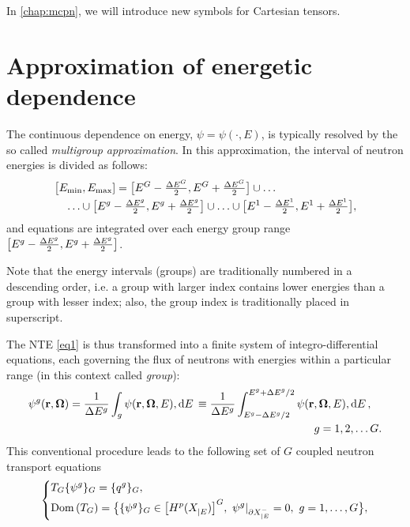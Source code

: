 In \cref{chap:mcpn}, we will introduce new symbols for Cartesian tensors.


\section{Approximation of energetic dependence}\label{sec:MG}

The continuous dependence on energy, $\psi = \psi(\cdot, E)$, is typically resolved by the so called \textit{multigroup
approximation}. In this approximation, the interval of neutron energies is divided as follows:
$$
\begin{multlined}
  \bigl[\Emin,\Emax] = \bigl[E^{G}-\dEh{G},E^{G}+\dEh{G}\bigr]\cup \ldots\\
  \ldots \cup \bigl[E^{g}-\dEh{g}, E^{g}+\dEh{g}\bigr] \cup \ldots \cup
  \bigl[E^1-\dEh{1},E^{1}+\dEh{1}\bigr],
\end{multlined} 
$$
and equations  are integrated over each energy group range 
\linebreak
\mbox{$\bigl[E^{g}-\tfrac{\Delta E^{g}}{2}, E^{g}+\tfrac{\Delta E^{g}}{2}\bigr]$}.
\begin{remark}
Note that the energy intervals (groups) are traditionally numbered in a descending order, i.e. a group with larger index
contains lower energies than a group with lesser index; also, the group index is traditionally placed in superscript. 
\end{remark}
The NTE \eqref{eq1} is thus transformed into a finite system of integro-differential equations, each
governing the flux of neutrons with energies within a particular range (in this context called \textit{group}):
\begin{equation}\label{eq:psi-MG}
\begin{multlined}
  \psi^g(\br, \bomega) = \frac{1}{\Delta E^{g}}\int_{g}\psi(\br, \bomega, E),\d{E} \equiv
  \frac{1}{\Delta E^{g}}\int_{E^g-\Delta E^{g}/2}^{E^g+\Delta E^{g}/2}\psi(\br, \bomega, E),\d{E},\\ g = 1, 2,\ldots
  G.
\end{multlined}
\end{equation} 
This conventional procedure leads to the following set of $G$ coupled neutron transport equations
\begin{equation}\label{eq:mg}
	\left\{
	  \begin{aligned}
      &T_G\{\psi^g\}_G = \{q^g\}_G,\\
      &\Dom{T_G} = \bigl\{\{\psi^g\}_G\in \bigl[\Hp(\XE)\bigr]^G,\ \psi^g\vert_{\pXE[-]} = 0,\ g = 1,\ldots,G\bigr\},
    \end{aligned}
  \right.\\[.2em]
\end{equation}
